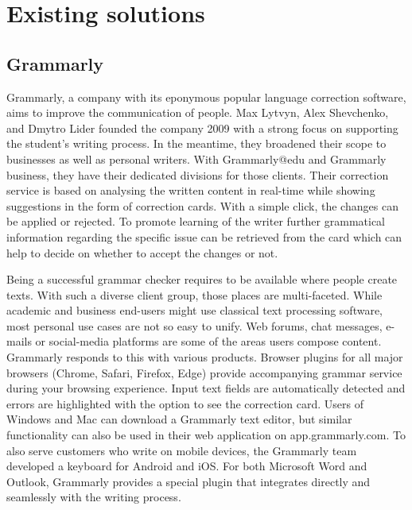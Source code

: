 \documentclass[runningheads]{llncs}
\let\OldTextregistered\textregistered
\renewcommand{\textregistered}{\OldTextregistered\xspace}%
\begin{document}

\section{Existing solutions}
\subsection{Grammarly\textregistered}
Grammarly\textregistered, a company with its eponymous popular language correction software, aims to improve the communication of people. Max Lytvyn, Alex Shevchenko, and Dmytro Lider founded the company 2009 with a strong focus on supporting the student's writing process. In the meantime, they broadened their scope to businesses as well as personal writers. With Grammarly\textregistered @edu and Grammarly\textregistered business, they have their dedicated divisions for those clients. Their correction service is based on analysing the written content in real-time while showing suggestions in the form of correction cards.  With a simple click, the changes can be applied or rejected. To promote learning of the writer further grammatical information regarding the specific issue can be retrieved from the card which can help to decide on whether to accept the changes or not. \citep{noauthor_write_nodate}

Being a successful grammar checker requires to be available where people create texts. With such a diverse client group, those places are multi-faceted. While academic and business end-users might use classical text processing software, most personal use cases are not so easy to unify. Web forums, chat messages, e-mails or social-media platforms are some of the areas users compose content. Grammarly\textregistered responds to this with various products. Browser plugins for all major browsers (Chrome, Safari, Firefox, Edge) provide accompanying grammar service during your browsing experience. Input text fields are automatically detected and errors are highlighted with the option to see the correction card. Users of Windows and Mac can download a Grammarly\textregistered text editor, but similar functionality can also be used in their web application on app.grammarly.com. To also serve customers who write on mobile devices, the Grammarly\textregistered team developed a keyboard for Android and iOS. For both Microsoft Word and Outlook, Grammarly\textregistered provides a special plugin that integrates directly and seamlessly with the writing process.
\end{document}
